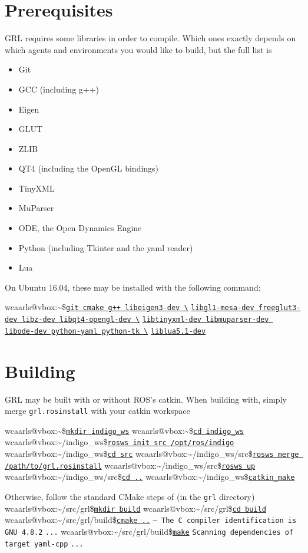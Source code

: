 \documentclass{article}
\makeatletter
\newcommand{\inp}[1]{\texttt{\underline{#1}}}
\newcommand{\txt}[1]{\texttt{#1}}
\newcommand{\promptm}{wcaarls@vbox:\~{}/src/grl\$\xspace}
\newcommand{\promptmb}{wcaarls@vbox:\~{}/src/grl/build\$\xspace}
\newcommand{\prompt}{wcaarls@vbox:\~{}\$\xspace}
\newcommand{\prompth}{wcaarls@vbox:\~{}/indigo\_ws\$\xspace}
\newcommand{\prompths}{wcaarls@vbox:\~{}/indigo\_ws/src\$\xspace}
\newenvironment{code}{\alltt}{\endalltt}
\makeatother
\begin{document}
\section{Prerequisites}

GRL requires some libraries in order to compile. Which ones exactly depends
on which agents and environments you would like to build, but the full list
is

\begin{itemize}
  \item Git
  \item GCC (including g++)
  \item Eigen
  \item GLUT
  \item ZLIB
  \item QT4 (including the OpenGL bindings)
  \item TinyXML
  \item MuParser
  \item ODE, the Open Dynamics Engine
  \item Python (including Tkinter and the yaml reader)
  \item Lua
\end{itemize}

On Ubuntu 16.04, these may be installed with the following command:

\begin{code}
\prompt \inp{git cmake g++ libeigen3-dev \textbackslash}
\inp{libgl1-mesa-dev freeglut3-dev libz-dev libqt4-opengl-dev \textbackslash}
\inp{libtinyxml-dev libmuparser-dev libode-dev python-yaml python-tk \textbackslash}
\inp{liblua5.1-dev}
\end{code}

\section{Building}

GRL may be built with or without ROS's catkin. When building with, simply
merge \txt{grl.rosinstall} with your catkin workspace

\begin{code}
{\color{Gray}\prompt \inp{mkdir indigo\_ws}
\prompt \inp{cd indigo\_ws}
\prompth \inp{rosws init src /opt/ros/indigo}
\prompth \inp{cd src}}
\prompths \inp{rosws merge /path/to/grl.rosinstall} 
\prompths \inp{rosws up}
\prompths \inp{cd ..}
\prompth \inp{catkin\_make}
\end{code}

Otherwise, follow the standard CMake steps of (in the \txt{grl} directory)
\begin{code}
\promptm \inp{mkdir build}
\promptm \inp{cd build}
\promptmb \inp{cmake ..}
\txt{-- The C compiler identification is GNU 4.8.2}
\txt{...}
\promptmb \inp{make}
\txt{Scanning dependencies of target yaml-cpp}
\txt{...}
\end{code}
\end{document}
